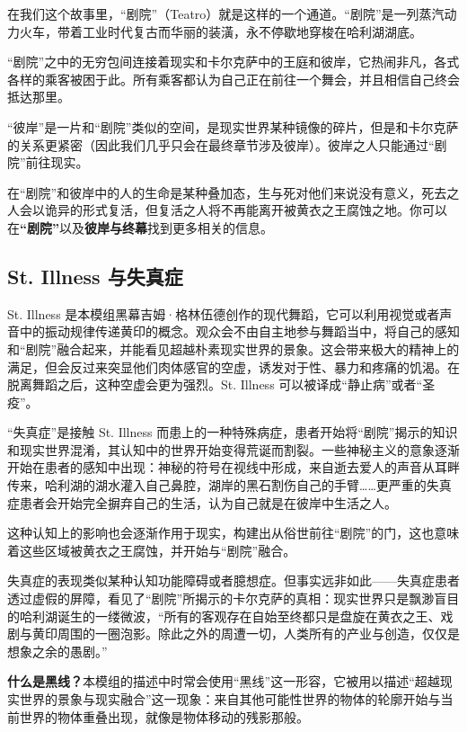 在我们这个故事里，“剧院”（Teatro）就是这样的一个通道。“剧院”是一列蒸汽动力火车，带着工业时代复古而华丽的装潢，永不停歇地穿梭在哈利湖湖底。

“剧院”之中的无穷包间连接着现实和卡尔克萨中的王庭和彼岸，它热闹非凡，各式各样的乘客被困于此。所有乘客都认为自己正在前往一个舞会，并且相信自己终会抵达那里。

“彼岸”是一片和“剧院”类似的空间，是现实世界某种镜像的碎片，但是和卡尔克萨的关系更紧密（因此我们几乎只会在最终章节涉及彼岸）。彼岸之人只能通过“剧院”前往现实。

在“剧院”和彼岸中的人的生命是某种叠加态，生与死对他们来说没有意义，死去之人会以诡异的形式复活，但复活之人将不再能离开被黄衣之王腐蚀之地。你可以在\textbf{“剧院”}以及\textbf{彼岸与终幕}找到更多相关的信息。

\subsection{St. Illness 与失真症}
St. Illness 是本模组黑幕吉姆·格林伍德创作的现代舞蹈，它可以利用视觉或者声音中的振动规律传递黄印的概念。观众会不由自主地参与舞蹈当中，将自己的感知和“剧院”融合起来，并能看见超越朴素现实世界的景象。这会带来极大的精神上的满足，但会反过来突显他们肉体感官的空虚，诱发对于性、暴力和疼痛的饥渴。在脱离舞蹈之后，这种空虚会更为强烈。St. Illness 可以被译成“静止病”或者“圣疫”。

“失真症”是接触 St. Illness 而患上的一种特殊病症，患者开始将“剧院”揭示的知识和现实世界混淆，其认知中的世界开始变得荒诞而割裂。一些神秘主义的意象逐渐开始在患者的感知中出现：神秘的符号在视线中形成，来自逝去爱人的声音从耳畔传来，哈利湖的湖水灌入自己鼻腔，湖岸的黑石割伤自己的手臂……更严重的失真症患者会开始完全摒弃自己的生活，认为自己就是在彼岸中生活之人。

这种认知上的影响也会逐渐作用于现实，构建出从俗世前往“剧院”的门，这也意味着这些区域被黄衣之王腐蚀，并开始与“剧院”融合。

失真症的表现类似某种认知功能障碍或者臆想症。但事实远非如此——失真症患者透过虚假的屏障，看见了“剧院”所揭示的卡尔克萨的真相：现实世界只是飘渺盲目的哈利湖诞生的一缕微波，“所有的客观存在自始至终都只是盘旋在黄衣之王、戏剧与黄印周围的一圈泡影。除此之外的周遭一切，人类所有的产业与创造，仅仅是想象之余的愚剧。”

\textbf{什么是黑线？}本模组的描述中时常会使用“黑线”这一形容，它被用以描述“超越现实世界的景象与现实融合”这一现象：来自其他可能性世界的物体的轮廓开始与当前世界的物体重叠出现，就像是物体移动的残影那般。
